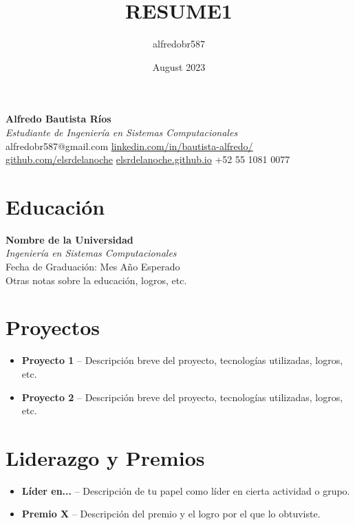 \documentclass[a4paper,10pt]{article}
\title{RESUME1}
\author{alfredobr587 }
\date{August 2023}
\makeatletter
\newcommand{\fullname}{Alfredo Bautista Ríos}
\newcommand{\email}{alfredobr587@gmail.com}
\newcommand{\linkedin}{\href{https://www.linkedin.com/in/bautista-alfredo/}{linkedin.com/in/bautista-alfredo/}}
\newcommand{\github}{\href{https://github.com/elsrdelanoche}{github.com/elsrdelanoche}}
\newcommand{\website}{\href{https://elsrdelanoche.github.io/dist/}{elsrdelanoche.github.io}}
\newcommand{\phone}{+52 55 1081 0077}
\newenvironment{tightitemize}{
\begin{itemize}[noitemsep,topsep=0pt]
}{\end{itemize}}
\makeatother
\begin{document}
\pagestyle{empty} %

\begin{center}
    {\Huge \textbf{\fullname}} \\
    \vspace{5pt}
    {\small \textit{Estudiante de Ingeniería en Sistemas Computacionales}} \\
    \vspace{5pt}
    \faEnvelope \hspace{2pt} \email \hspace{10pt}
    \faLinkedin \hspace{2pt} \linkedin \hspace{10pt}
    \faGithub \hspace{2pt} \github \hspace{10pt}
    \faGlobe \hspace{2pt} \website \hspace{10pt}
    \faPhone \hspace{2pt} \phone
\end{center}

\section*{Educación}
\textbf{Nombre de la Universidad} \\
\textit{Ingeniería en Sistemas Computacionales} \\
Fecha de Graduación: Mes Año Esperado \\
Otras notas sobre la educación, logros, etc.

\section*{Proyectos}
\begin{tightitemize}
    \item \textbf{Proyecto 1} -- Descripción breve del proyecto, tecnologías utilizadas, logros, etc.
    \item \textbf{Proyecto 2} -- Descripción breve del proyecto, tecnologías utilizadas, logros, etc.
\end{tightitemize}

\section*{Liderazgo y Premios}
\begin{tightitemize}
    \item \textbf{Líder en...} -- Descripción de tu papel como líder en cierta actividad o grupo.
    \item \textbf{Premio X} -- Descripción del premio y el logro por el que lo obtuviste.
\end{tightitemize}
\end{document}
